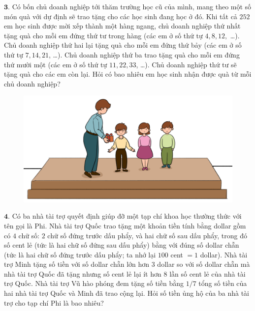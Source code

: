 \begin{multicols}{2}
\begin{figure}[H]
		\vspace*{-5pt}
	\end{figure}
	$\pmb{3.}$ 	Có bốn chủ doanh nghiệp tới thăm trường học cũ của mình, mang theo một số món quà với dự định sẽ trao tặng cho các học sinh đang học ở đó. Khi tất cả $252$ em học sinh được mời xếp thành một hàng ngang, chủ doanh nghiệp thứ nhất tặng quà cho mỗi em đứng thứ tư trong hàng (các em ở số thứ tự $4,8,12,$ \ldots). Chủ doanh nghiệp thứ hai lại tặng quà cho mỗi em đứng thứ bảy (các em ở số thứ tự $7,14,21$, \ldots). Chủ doanh nghiệp thứ ba trao tặng quà cho mỗi em đứng thứ mười một (các em ở số thứ tự $11,22,33$, \ldots). Chủ doanh nghiệp thứ tư sẽ tặng quà cho các em còn lại. Hỏi có bao nhiêu em học sinh nhận được quà từ mỗi chủ doanh nghiệp?
	\begin{figure}[H]
		\centering
		\vspace*{-5pt}
		\captionsetup{labelformat= empty, justification=centering}
		\includegraphics[width=1\linewidth]{Hinh3}
		\vspace*{-15pt}
	\end{figure}
	$\pmb{4.}$ 	Có ba nhà tài trợ quyết định giúp đỡ một tạp chí khoa học thường thức với tên gọi là Phi. Nhà tài trợ Quốc trao tặng một khoản tiền tính bằng dollar gồm có $4$ chữ số: $2$ chữ số đứng trước dấu phẩy, và hai chữ số sau dấu phẩy, trong đó số cent lẻ (tức là hai chữ số đứng sau dấu phẩy) bằng với đúng số dollar chẵn (tức là hai chữ số đứng trước dấu phẩy; ta nhớ lại $100$ cent $= 1$ dollar). Nhà tài trợ Minh tặng số tiền với số dollar chẵn lớn hơn $3$ dollar so với số dollar chẵn mà nhà tài trợ Quốc đã tặng nhưng số cent lẻ lại ít hơn $8$ lần số cent lẻ của nhà tài trợ Quốc. Nhà tài trợ Vũ hào phóng đem tặng số tiền bằng $1/7$ tổng số tiền của hai nhà tài trợ Quốc và Minh đã trao cộng lại. Hỏi số tiền ủng hộ của ba nhà tài trợ cho tạp chí Phi là bao nhiêu?
	\begin{figure}[H]

\end{figure}
\end{multicols}
